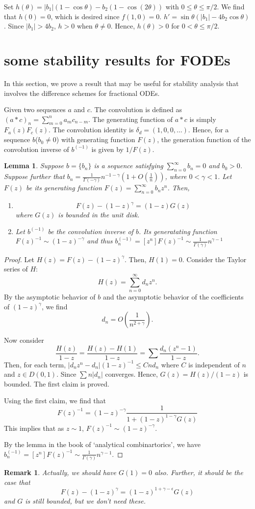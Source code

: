 \documentclass[11pt]{article}
\newtheorem{lmm}{Lemma}
\newtheorem{rmk}{Remark}
\begin{document}
Set $h(\theta)=|b_1|(1-\cos\theta)-b_2(1-\cos(2\theta))$ with $0\le\theta\le \pi/2$. We find that $h(0)=0$, which is desired since $f(1,0)=0$. $h'=\sin\theta (|b_1|-4b_2\cos\theta)$. Since $|b_1|>4b_2$, $h>0$ when $\theta\neq 0$.  Hence, $h(\theta)>0$ for $0<\theta\le \pi/2$.

\section{some stability results for FODEs}
In this section, we prove a result that may be useful for stability analysis
that involves the difference schemes for fractional ODEs.

Given two sequences $a$ and $c$. The convolution is defined as $(a*c)_n=\sum_{m=0}^n a_mc_{n-m}$. The generating function of $a*c$ is simply $F_a(z)F_c(z)$. The convolution identity is $\delta_d=(1,0,0,\ldots)$. Hence, for a sequence $b$($b_0\neq 0$) with generating function $F(z)$, the generation function of the convolution inverse of $b^{(-1)}$ is given by $1/F(z)$.
\begin{lmm}
Suppose $b=\{b_n\}$ is a sequence satisfying $\sum_{n=0}^{\infty}b_n=0$
and $b_0>0$. Suppose further that $b_n=\frac{1}{\Gamma(-\gamma)}n^{-1-\gamma}(1+O(\frac{1}{n}))$, where $0<\gamma<1$. Let $F(z)$ be its generating function $F(z)=\sum_{n=0}^{\infty}b_n z^n$. Then, 
\begin{enumerate}
\item $$
F(z)-(1-z)^{\gamma}=(1-z)G(z)
$$
where $G(z)$ is bounded in the unit disk.
\item Let $b^{(-1)}$ be the convolution inverse of $b$. Its generatating function $F(z)^{-1}\sim (1-z)^{-\gamma}$ and thus $b^{(-1)}_n=[z^n]F(z)^{-1}\sim \frac{1}{\Gamma(\gamma)}n^{\gamma-1}$ 
\end{enumerate}
\end{lmm}
\begin{proof}
Let $H(z)=F(z)-(1-z)^{\gamma}$. Then, $H(1)=0$. Consider the Taylor series of $H$: $$
H(z)=\sum_{n=0}^{\infty}d_n z^n.
$$
By the asymptotic behavior of $b$ and the asymptotic behavior of the coefficients of $(1-z)^{\gamma}$, we find
$$d_n=O(\frac{1}{n^{2+\gamma}}).$$ 

Now consider $$
\frac{H(z)}{1-z}=\frac{H(z)-H(1)}{1-z}=\sum \frac{d_n(z^n-1)}{1-z}.
$$
Then, for each term, 
$|d_nz^n-d_n|(1-z)^{-1}\le Cnd_n$ where $C$ is independent of $n$ and $z\in D(0,1)$. Since $\sum n|d_n|$ converges. Hence, $G(z)=H(z)/(1-z)$ is bounded. The first claim is proved.


Using the first claim, we find that $$
F(z)^{-1}=(1-z)^{-\gamma}\frac{1}{1+(1-z)^{1-\gamma}G(z)}
$$
This implies that as $z\sim 1$, $F(z)^{-1}\sim (1-z)^{-\gamma}$.

By the lemma in the book of `analytical combinartorics', we have 
$b^{(-1)}_n=[z^n]F(z)^{-1}\sim \frac{1}{\Gamma(\gamma)}n^{\gamma-1}$.
\end{proof}
\begin{rmk}
Actually, we should have $G(1)=0$ also. Further, it should be the case that 
$$
F(z)-(1-z)^{\gamma}=(1-z)^{1+\gamma-\epsilon}G(z)
$$
and $G$ is still bounded, but we don't need these.
\end{rmk}
\end{document}
